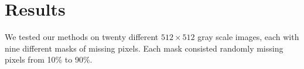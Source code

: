 \section{Results}
\label{sec:results}

We tested our methods on twenty different $512\times 512$ gray scale images, each with nine different masks of missing pixels. Each mask consisted randomly missing pixels from 10\% to 90\%.

